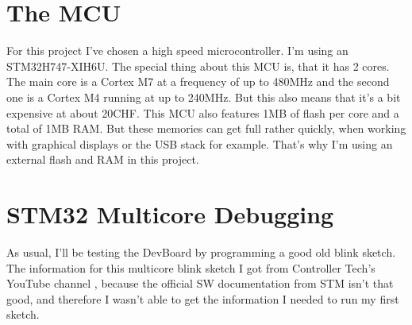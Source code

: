\newpage
\section{The MCU}
For this project I've chosen a high speed microcontroller. I'm using an STM32H747-XIH6U. The special thing about this MCU is, that it has 2 cores. The main core is a Cortex M7 at a frequency of up to 480MHz and the second one is a Cortex M4 running at up to 240MHz. But this also means that it's a bit expensive at about 20CHF. This MCU also features 1MB of flash per core and a total of 1MB RAM. But these memories can get full rather quickly, when working with graphical displays or the USB stack for example. That's why I'm using an external flash and RAM in this project.
\\


\section{STM32 Multicore Debugging}
As usual, I'll be testing the DevBoard by programming a good old blink sketch. The information for this multicore blink sketch I got from Controller Tech's YouTube channel \cite{YT_CT_Mutlicore_Debugging}, because the official SW documentation from STM isn't that good, and therefore I wasn't able to get the information I needed to run my first sketch.

